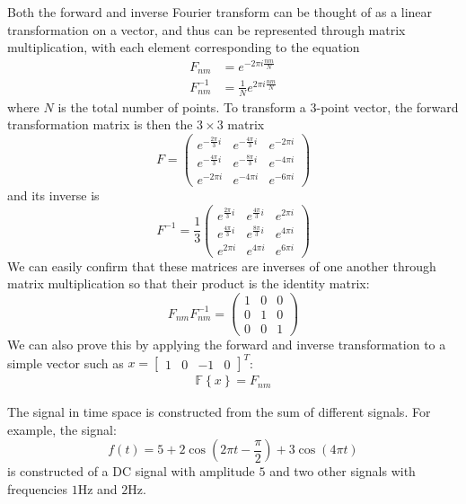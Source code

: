 \documentclass[11pt, letterpage]{article}
\begin{document}
Both the forward and inverse Fourier transform can be thought of as a linear
transformation on a vector, and thus can be represented through matrix
multiplication, with each element corresponding to the equation
\begin{equation}
  \begin{aligned}
    F_{nm} &= e^{- 2 \pi i \frac{nm}{N}} \\
    F_{nm}^{-1} &= \frac{1}{N} e^{2 \pi i \frac{nm}{N}}
  \end{aligned}
  \label{fft_mat_el}
\end{equation}
where $N$ is the total number of points. To transform a $3$-point vector, the
forward transformation matrix is then the $3 \times 3$ matrix
\begin{equation}
  F =
  \begin{pmatrix}
    e^{- \frac{2 \pi}{3} i} & e^{- \frac{4 \pi}{3} i} & e^{- 2 \pi i} \\
    e^{- \frac{4 \pi}{3} i} & e^{- \frac{8 \pi}{3} i} & e^{- 4 \pi i} \\
    e^{- 2 \pi i} & e^{- 4 \pi i} & e^{- 6 \pi i}
  \end{pmatrix}
\end{equation}
and its inverse is
\begin{equation}
  F^{-1} = \frac{1}{3}
  \begin{pmatrix}
    e^{\frac{2 \pi}{3} i} & e^{\frac{4 \pi}{3} i} & e^{2 \pi i} \\
    e^{\frac{4 \pi}{3} i} & e^{\frac{8 \pi}{3} i} & e^{4 \pi i} \\
    e^{2 \pi i} & e^{4 \pi i} & e^{6 \pi i}
  \end{pmatrix}
\end{equation}
We can easily confirm that these matrices are inverses of one another through
matrix multiplication so that their product is the identity matrix:
\begin{equation}
  F_{nm}F_{nm}^{-1}
  = \begin{pmatrix}
    1 & 0 & 0 \\
    0 & 1 & 0 \\
    0 & 0 & 1
  \end{pmatrix}
\end{equation}
We can also prove this by applying the forward and inverse transformation to a
simple vector such as $x = \begin{bmatrix} 1 & 0 & -1 & 0 \end{bmatrix}^T$:
\begin{equation}
  \begin{aligned}
    \mathbb{F} \left\{ x \right\}
    = F_{nm}
  \end{aligned}
\end{equation}

The signal in time space is constructed from the sum of different signals. For
example, the signal:
\begin{equation}
  f(t) = 5 + 2 \cos\left( 2 \pi t - \frac{\pi}{2} \right) + 3 \cos(4 \pi t)
\end{equation}
is constructed of a DC signal with amplitude $5$ and two other signals with
frequencies $1$Hz and $2$Hz. 
\end{document}
